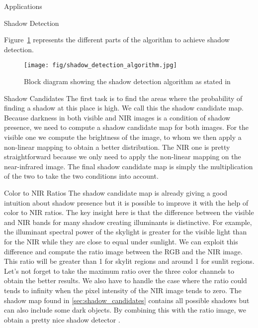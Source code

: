 \documentclass[10pt]{article}
\begin{document}
\begin{section}{Applications}
\begin{subsection}{Shadow Detection}
        \medskip

        Figure~\ref{fig:shadow_detection_algorithm} represents the different parts of the algorithm to achieve shadow detection.

        \begin{figure}[!h]
            \begin{center}
                \texttt{[image: fig/shadow\_detection\_algorithm.jpg]}
                \caption{Block diagram showing the shadow detection algorithm as stated in \cite{shadow}}
                \label{fig:shadow_detection_algorithm}
            \end{center}
        \end{figure}

        \begin{subsubsection}{Shadow Candidates}
            \label{sec:shadow_candidates}
            The first task is to find the areas where the probability of finding a shadow at this place is high. We call this the shadow candidate map. Because darkness in both visible and NIR images is a condition of shadow presence, we need to compute a shadow candidate map for both images. For the visible one we compute the brightness of the image, to whom we then apply a non-linear mapping to obtain a better distribution. The NIR one is pretty straightforward because we only need to apply the non-linear mapping on the near-infrared image. The final shadow candidate map is simply the multiplication of the two to take the two conditions into account.
        \end{subsubsection}

        \begin{subsubsection}{Color to NIR Ratios}
            \label{sec:color2NIR_ratios}
            The shadow candidate map is already giving a good intuition about shadow presence but it is possible to improve it with the help of color to NIR ratios. The key insight here is that the difference between the visible and NIR bands for many shadow creating illuminants is distinctive. For example, the illuminant spectral power of the skylight is greater for the visible light than for the NIR while they are close to equal under sunlight. We can exploit this difference and compute the ratio image between the RGB and the NIR image. This ratio will be greater than 1 for skylit regions and around 1 for sunlit regions. Let's not forget to take the maximum ratio over the three color channels to obtain the better results. We also have to handle the case where the ratio could tends to infinity when the pixel intensity of the NIR image tends to zero. The shadow map found in \ref{sec:shadow_candidates} contains all possible shadows but can also include some dark objects. By combining this with the ratio image, we obtain a pretty nice shadow detector .
        \end{subsubsection}


\end{subsection}
\end{section}
\end{document}
